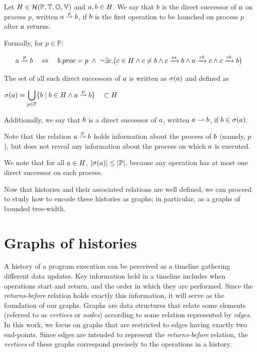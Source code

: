 \documentclass[12pt]{article}
\begin{document}
\begin{nameddefinition}
Let $H\in\mathcal{H}(\mathbb{P}, \mathbb{T}, \mathbb{O}, \mathbb{V})$ and $a,b\in H$. We say that $b$ is the direct successor of $a$ on process $p$, written $a \stackrel{p}{\rightharpoonup} b$, if $b$ is the first operation to be launched on process $p$ after $a$ returns.

Formally, for $p \in \mathbb{P}$:

\[
a\stackrel{p}{\rightharpoonup}b \quad \Leftrightarrow \quad b.proc=p \;\land\; 
\neg\exists c.\big( c\in H\land c\neq b\land c\xrightarrow{ss}b\land  a\xrightarrow{rb}c  \land  c\xrightarrow{rb}b   \big)
\]

The set of all such direct successors of $a$ is written as $\sigma(a)$ and defined as


\begin{center}
$\sigma(a) = \displaystyle\bigcup_{p \in \mathbb{P}} \{b \mid 
b \in H  \land a\stackrel{p}{\rightharpoonup}b  \}
\quad \subset H$
\end{center} 

Additionally, we say that $b$ is a direct successor of $a$, written $a\rightharpoonup b$, if $b\in\sigma(a)$.

Note that the relation $a\stackrel{p}{\rightharpoonup}b$ holds information about the process of $b$ (namely, $p$), but does not reveal any information about the process on which $a$ is executed.
\end{nameddefinition}



We note that for all $a \in H$, $|\sigma(a)| \leq |\mathbb{P}|$, because any operation has at most one direct successor on each process.

\vspace{1em}

Now that histories and their associated relations are well defined, we can proceed to study how to encode these histories as graphs; in particular, as a graphs of bounded tree-width.

\section{Graphs of histories}

A history of a program execution can be perceived as a timeline gathering different data updates. Key information held in a timeline includes when operations start and return, and the order in which they are performed. Since the \textsl{returns-before} relation holds exactly this information, it will serve as the foundation of our graphs. Graphs are data structures that relate some elements (referred to as \textsl{vertices} or \textsl{nodes}) according to some relation represented by \textsl{edges}. In this work, we focus on graphs that are restricted to edges having exactly two end-points. Since edges are intended to represent the \textsl{returns-before} relation, the \textsl{vertices} of these graphs correspond precisely to the operations in a history. 
\end{document}
